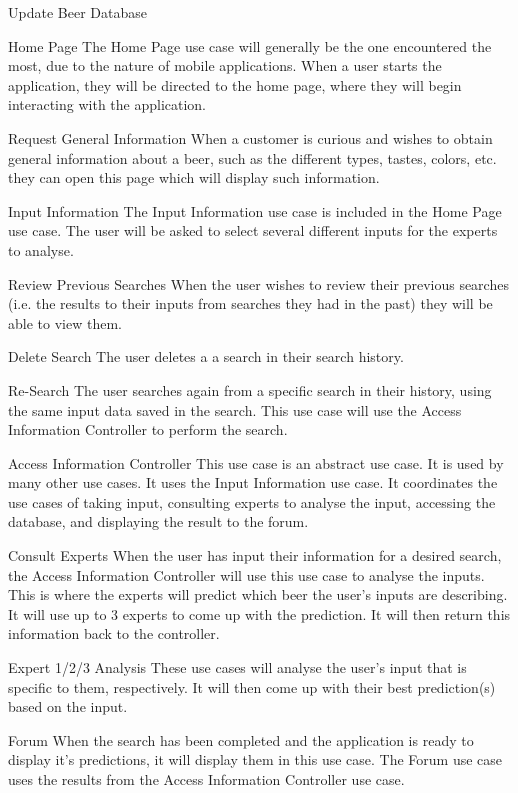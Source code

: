 \documentclass[]{article}
\begin{document}
\begin{labeling}{Update Beer Database}
\item [Home Page] The Home Page use case will generally be the one encountered the most, due to the nature of mobile applications. When a user starts the application, they will be directed to the home page, where they will begin interacting with the application.
\item [Request General Information] When a customer is curious and wishes to obtain general information about a beer, such as the different types, tastes, colors, etc. they can open this page which will display such information.
\item [Input Information] The Input Information use case is included in the Home Page use case. The user will be asked to select several different inputs for the experts to analyse. 
\item [Review Previous Searches] When the user wishes to review their previous searches (i.e. the results to their inputs from searches they had in the past) they will be able to view them.
\item [Delete Search] The user deletes a a search in their search history.
\item [Re-Search] The user searches again from a specific search in their history, using the same input data saved in the search. This use case will use the Access Information Controller to perform the search.
\item [Access Information Controller] This use case is an abstract use case. It is used by many other use cases. It uses the Input Information use case. It coordinates the use cases of taking input, consulting experts to analyse the input, accessing the database, and displaying the result to the forum. 
\item [Consult Experts] When the user has input their information for a desired search, the Access Information Controller will use this use case to analyse the inputs. This is where the experts will predict which beer the user's inputs are describing. It will use up to 3 experts to come up with the prediction. It will then return this information back to the controller.
\item [Expert 1/2/3 Analysis] These use cases will analyse the user's input that is specific to them, respectively. It will then come up with their best prediction(s) based on the input.
\item [Forum] When the search has been completed and the application is ready to display it's predictions, it will display them in this use case. The Forum use case uses the results from the Access Information Controller use case. 

\end{labeling}
\end{document}
